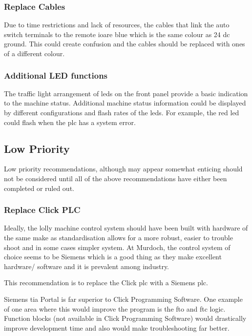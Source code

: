         \subsubsection{Replace Cables} 
            Due to time restrictions and lack of resources, the cables that link the auto switch terminals to the remote \acrshort{io}are blue which is the same colour as 24 \acrshort{dc} ground. This could create confusion and the cables should be replaced with ones of a different colour.      
 
        \subsubsection{Additional LED functions}
            The traffic light arrangement of \acrshort{led}s on the front panel provide a basic indication to the machine status. Additional machine status information could be displayed by different configurations and flash rates of the \acrshort{led}s. For example, the red \acrshort{led} could flash when the \acrshort{plc} has a system error.
            
    \subsection{Low Priority}
        Low priority recommendations, although may appear somewhat enticing should not be considered until all of the above recommendations have either been completed or ruled out.
        
        \subsubsection{Replace Click PLC} \label{sec:replacePlc}
            Ideally, the lolly machine control system should have been built with hardware of the same make as standardisation allows for a more robust, easier to trouble shoot and in some cases simpler system. At Murdoch, the control system of choice seems to be Siemens which is a good thing as they make excellent hardware/ software and it is prevalent among industry.
            
            This recommendation is to replace the Click \acrshort{plc} with a Siemens \acrshort{plc}. 
            
            Siemens \acrshort{tia} Portal is far superior to Click Programming Software. One example of one area where this would improve the program is the \acrshort{fto} and \acrshort{ftc} logic. Function blocks (not available in Click Programming Software) would drastically improve development time and also would make troubleshooting far better.

